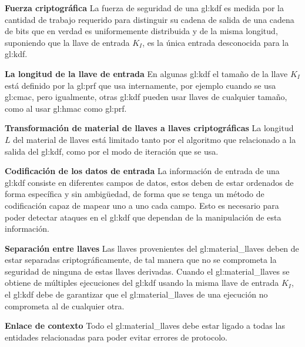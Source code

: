 \textbf{Fuerza criptográfica}
La fuerza de seguridad de una \gls{gl:kdf} es medida por la cantidad de 
trabajo requerido para distinguir su cadena de salida de una cadena de bits 
que en verdad es uniformemente distribuida y de la misma longitud, suponiendo 
que la llave de entrada $K_I$, es la única entrada desconocida para la 
\gls{gl:kdf}.

\textbf{La longitud de la llave de entrada}
En algunas \gls{gl:kdf} el tamaño de la llave $K_I$ está definido por la 
\gls{gl:prf} que usa internamente, por ejemplo cuando se usa \gls{gl:cmac}, 
pero igualmente, otras \gls{gl:kdf} pueden usar llaves de cualquier tamaño, 
como al usar \gls{gl:hmac} como \gls{gl:prf}.

\textbf{Transformación de material de llaves a llaves criptográficas}
La longitud $L$ del material de llaves está limitado tanto por el algoritmo 
que relacionado a la salida del \gls{gl:kdf}, como por el modo de iteración 
que se usa.

\textbf{Codificación de los datos de entrada}
La información de entrada de una \gls{gl:kdf} consiste en diferentes campos 
de datos, estos deben de estar ordenados de forma específica y sin ambigüedad, 
de forma que se tenga un método de codificación capaz de mapear uno a uno cada 
campo. Esto es necesario para poder detectar ataques en el \gls{gl:kdf} que 
dependan de la manipulación de esta información.

\textbf{Separación entre llaves}
Las llaves provenientes del \gls{gl:material_llaves} deben de estar separadas 
criptográficamente, de tal manera que no se comprometa la seguridad de ninguna 
de estas llaves derivadas. Cuando el \gls{gl:material_llaves} se obtiene de 
múltiples ejecuciones del \gls{gl:kdf} usando la misma llave de entrada $K_I$, 
el \gls{gl:kdf} debe de garantizar que el \gls{gl:material_llaves} de una 
ejecución no comprometa al de cualquier otra.

\textbf{Enlace de contexto}
Todo el \gls{gl:material_llaves} debe estar ligado a todas las entidades 
relacionadas para poder evitar errores de protocolo.

